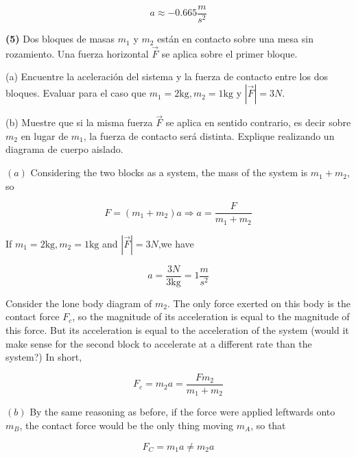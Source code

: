 \documentclass[12pt]{article}
\theoremstyle{definition}
\begin{document}
\begin{equation}
    a \approx -0.665 \frac{m}{s^2}
\end{equation}

\pagebreak 

\begin{shaded}
    \textbf{(5)} Dos bloques de masas $m_1$ y $m_2$ están en contacto sobre una mesa
    sin rozamiento. Una fuerza horizontal $\vec{F}$ se aplica sobre el primer
    bloque.

(a) Encuentre la aceleración del sistema y la fuerza de contacto entre los dos
bloques. Evaluar para el caso que $m_1 = 2\text{kg}, m_2 = 1\text{kg}$ y $\left|
\vec{F} \right| = 3N $. 

(b) Muestre que si la misma fuerza $\vec{F}$ se aplica en sentido contrario, es
decir sobre $m_2$ en lugar de $m_1$, la fuerza de contacto será distinta.
Explique realizando un diagrama de cuerpo aislado.
\end{shaded}

$(a)$ Considering the two blocks as a system, the mass of the system is $m_1 + m_2$,
so 

\begin{equation}
    F = (m_1 + m_2)a \Rightarrow a = \frac{F}{m_1 + m_2}
\end{equation}

If $m_1 = 2\text{kg}, m_2 = 1\text{kg}$ and $\left| \vec{F}\right| = 3N$,we have 

\begin{equation}
    a = \frac{3N}{3\text{kg}} = 1\frac{m}{s^2}
\end{equation}

Consider the lone body diagram of $m_2$. The only force exerted on this body is
the contact force $F_c$, so the magnitude of its acceleration is equal to the
magnitude of this force. But its acceleration is equal to the acceleration of
the system (would it make sense for the second block to accelerate at a
different rate than the system?) In short,

\begin{equation}
    F_c = m_2 a = \frac{F m_2}{m_1 + m_2} 
\end{equation}

$(b)$ By the same reasoning as before, if the force were applied leftwards onto
$m_B$, the contact force would be the only thing moving $m_A$, so that 

\begin{equation}
    F_C = m_1 a \neq m_2 a
\end{equation}
\end{document}
